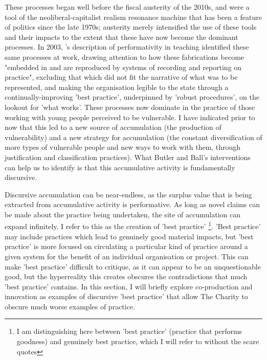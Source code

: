 These processes began well before the fiscal austerity of the 2010s, and were a tool of the neoliberal-capitalist realism resonance machine that has been a feature of politics since the late 1970s; austerity merely intensified the use of these tools and their impacts to the extent that these have now become the dominant processes. In 2003, \citet[225]{ball_teachers_2003}'s description of performativity in teaching identified these same processes at work, drawing attention to how these fabrications become "embedded in and are reproduced by systems of recording and reporting on practice", excluding that which did not fit the narrative of what was to be represented, and making the organisation legible to the state through a continually-improving 'best practice', underpinned by 'robust procedures', on the lookout for 'what works'. These processes  now dominate in the practice of those working with young people perceived to be vulnerable. I have indicated prior to now that this led to a new source of accumulation (the production of vulnerability) and a new strategy for accumulation (the constant diversification of more types of vulnerable people and new ways to work with them, through justification and classification practices). What Butler and Ball's interventions can help us to identify is that this accumulative activity is fundamentally discursive. 

Discursive accumulation can be near-endless, as the surplus value that is being extracted from accumulative activity is performative. As long as novel claims can be made about the practice being undertaken, the site of accumulation can expand infinitely. I refer to this as the creation of 'best practice' \footnote{I am distinguishing here between 'best practice' (practice that performs goodness) and genuinely best practice, which I will refer to without the scare quotes}.  'Best practice' may include practices which lead to genuinely good material impacts, but 'best practice' is more focused on circulating a particular kind of practice around a given system for the benefit of an individual organisation or project. This can make 'best practice' difficult to critique, as it can appear to be an unquestionable good, but the hyperreality this creates obscures the contradictions that much 'best practice' contains. In this section, I will briefly explore co-production and innovation as examples of discursive 'best practice' that allow The Charity to obscure much worse examples of practice.

